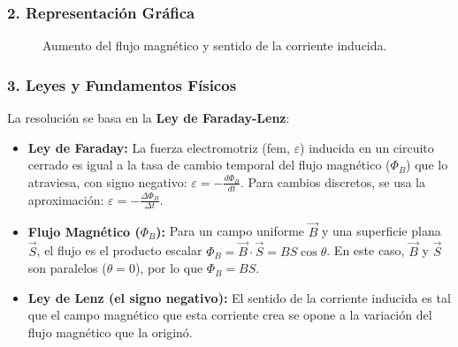 \subsubsection*{2. Representación Gráfica}
\begin{figure}[H]
    \centering
    \caption{Aumento del flujo magnético y sentido de la corriente inducida.}
\end{figure}

\subsubsection*{3. Leyes y Fundamentos Físicos}
La resolución se basa en la \textbf{Ley de Faraday-Lenz}:
\begin{itemize}
    \item \textbf{Ley de Faraday:} La fuerza electromotriz (fem, $\varepsilon$) inducida en un circuito cerrado es igual a la tasa de cambio temporal del flujo magnético ($\Phi_B$) que lo atraviesa, con signo negativo: $\varepsilon = -\frac{d\Phi_B}{dt}$. Para cambios discretos, se usa la aproximación: $\varepsilon = -\frac{\Delta\Phi_B}{\Delta t}$.
    \item \textbf{Flujo Magnético ($\Phi_B$):} Para un campo uniforme $\vec{B}$ y una superficie plana $\vec{S}$, el flujo es el producto escalar $\Phi_B = \vec{B} \cdot \vec{S} = B S \cos\theta$. En este caso, $\vec{B}$ y $\vec{S}$ son paralelos ($\theta=0$), por lo que $\Phi_B = B S$.
    \item \textbf{Ley de Lenz (el signo negativo):} El sentido de la corriente inducida es tal que el campo magnético que esta corriente crea se opone a la variación del flujo magnético que la originó.
\end{itemize}


